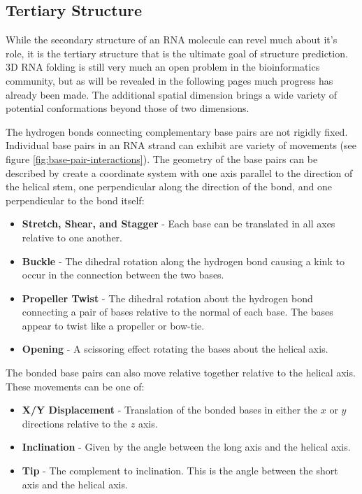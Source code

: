 \documentclass[journal]{IEEEtran}
\begin{document}
\subsection{Tertiary Structure}
\label{subsec:intro-rna-ter-structure}
While the secondary structure of an RNA molecule can revel much about it's role, it is the tertiary structure that is the ultimate goal of structure prediction. 3D RNA folding is still very much an open problem in the bioinformatics community, but as will be revealed in the following pages much progress has already been made. The additional spatial dimension brings a wide variety of potential conformations beyond those of two dimensions.

The hydrogen bonds connecting complementary base pairs are not rigidly fixed. Individual base pairs in an RNA strand can exhibit are variety of movements (see figure \ref{fig:base-pair-interactions}). The geometry of the base pairs can be described by create a coordinate system with one axis parallel to the direction of the helical stem, one perpendicular along the direction of the bond, and one perpendicular to the bond itself:

\begin{itemize}
	\item \textbf{Stretch, Shear, and Stagger} - Each base can be translated in all axes relative to one another.

	\item \textbf{Buckle} - The dihedral rotation along the hydrogen bond causing a kink to occur in the connection between the two bases.

	\item \textbf{Propeller Twist} - The dihedral rotation about the hydrogen bond connecting a pair of bases relative to the normal of each base. The bases appear to twist like a propeller or bow-tie.
	\item \textbf{Opening} - A scissoring effect rotating the bases about the helical axis.
\end{itemize}

The bonded base pairs can also move relative together relative to the helical axis. These movements can be one of:

\begin{itemize}
	\item \textbf{X/Y Displacement} - Translation of the bonded bases in either the $x$ or $y$ directions relative to the $z$ axis.
	\item \textbf{Inclination} - Given by the angle between the long axis and the helical axis.
	\item \textbf{Tip} - The complement to inclination. This is the angle between the short axis and the helical axis. 
\end{itemize}
\end{document}
